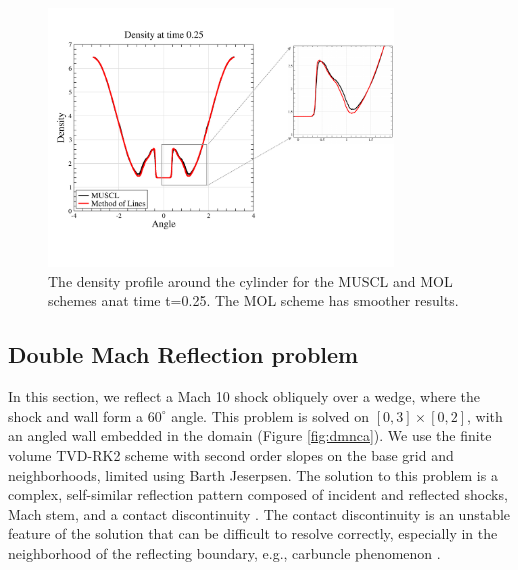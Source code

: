 \begin{figure}
\begin{center}
\hspace*{-.5in}
\includegraphics[height=2.7in]{figs/MM_densityBndry.pdf}
\hspace*{.3in}
\caption{\sf The density profile  around the cylinder for the MUSCL and MOL schemes anat time
t=0.25.  The MOL scheme has smoother results.}
\label{fig:cylbndry}
\end{center}
\end{figure}

\clearpage

\subsection{Double Mach Reflection problem}
In this section, we reflect a Mach 10 shock obliquely over a wedge, where the shock and wall form a $60^{\circ}$ angle.  
This problem is solved on $[0,3]\times[0,2]$, with an angled wall embedded in the domain (Figure \ref{fig:dmnca}).  
We use the finite volume TVD-RK2 scheme with second order slopes on the base grid and neighborhoods, limited using Barth Jeserpsen.
The solution to this problem is a complex, self-similar reflection pattern composed of incident and reflected shocks, Mach stem, and a contact discontinuity \cite{WOODWARD1984115}.  
The contact discontinuity is an unstable feature of the solution that can be difficult to resolve correctly, especially in the neighborhood of the reflecting boundary, e.g., carbuncle phenomenon \cite{KEMM2018596}.

